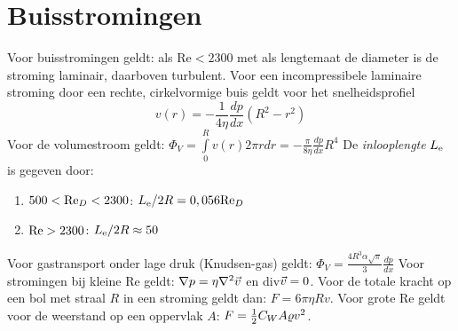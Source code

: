 \documentclass[twoside]{report}
\begin{document}
\section{Buisstromingen}
Voor buisstromingen geldt: als Re$<2300$ met als lengtemaat de diameter is de
stroming laminair, daarboven turbulent. Voor een incompressibele laminaire
stroming door een rechte, cirkelvormige buis geldt voor het snelheidsprofiel
\[
v(r)=-\frac{1}{4\eta}\frac{dp}{dx}(R^2-r^2)
\]
Voor de volumestroom geldt:
$\displaystyle\Phi_V=\int\limits_0^R v(r)2\pi rdr=-\frac{\pi}{8\eta}\frac{dp}{dx}R^4$
\npar
De {\it inlooplengte} $L_{\rm e}$ is gegeven door:
\begin{enumerate}
\item $500<{\rm Re}_D<2300$: $L_{\rm e}/2R=0,056{\rm Re}_D$
\item ${\rm Re}>2300$: $L_{\rm e}/2R\approx50$
\end{enumerate}
Voor gastransport onder lage druk (Knudsen-gas) geldt:
$\displaystyle\Phi_V=\frac{4R^3\alpha\sqrt{\pi}}{3}\frac{dp}{dx}$
\npar
Voor stromingen bij kleine Re geldt: $\nabla p=\eta\nabla^2\vec{v}$ en div$\vec{v}=0$.
Voor de totale kracht op een bol met straal $R$ in een stroming geldt dan:
$F=6\pi\eta Rv$. Voor grote Re geldt voor de weerstand op een oppervlak $A$:
$F=\mbox{$\frac{1}{2}$} C_WA\varrho v^2$.
\end{document}
